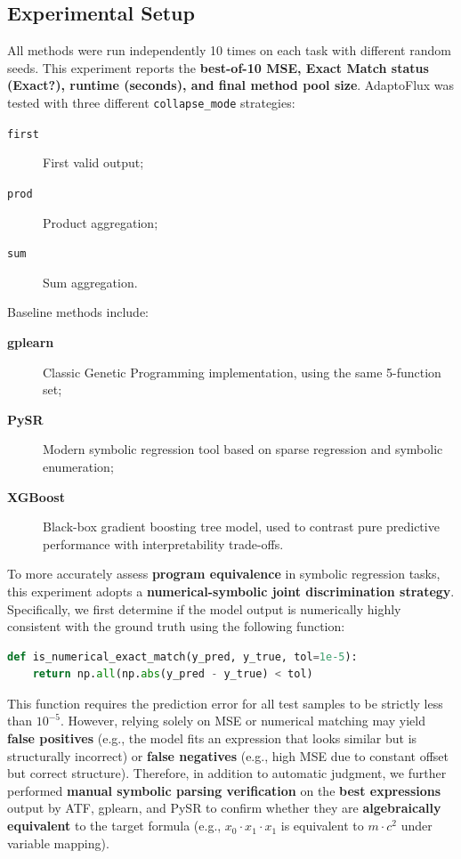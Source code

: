 \subsection{Experimental Setup}

All methods were run independently 10 times on each task with different random seeds. This experiment reports the \textbf{best-of-10 MSE, Exact Match status (Exact?), runtime (seconds), and final method pool size}. AdaptoFlux was tested with three different \texttt{collapse\_mode} strategies:
\begin{description}
    \item[\texttt{first}] First valid output;
    \item[\texttt{prod}] Product aggregation;
    \item[\texttt{sum}] Sum aggregation.
\end{description}

Baseline methods include:
\begin{description}
    \item[\textbf{gplearn}] Classic Genetic Programming implementation, using the same 5-function set;
    \item[\textbf{PySR}] Modern symbolic regression tool based on sparse regression and symbolic enumeration;
    \item[\textbf{XGBoost}] Black-box gradient boosting tree model, used to contrast pure predictive performance with interpretability trade-offs.
\end{description}

To more accurately assess \textbf{program equivalence} in symbolic regression tasks, this experiment adopts a \textbf{numerical-symbolic joint discrimination strategy}. Specifically, we first determine if the model output is numerically highly consistent with the ground truth using the following function:
\begin{lstlisting}[language=Python, basicstyle=\small\ttfamily]
def is_numerical_exact_match(y_pred, y_true, tol=1e-5):
    return np.all(np.abs(y_pred - y_true) < tol)
\end{lstlisting}
This function requires the prediction error for all test samples to be strictly less than $10^{-5}$. However, relying solely on MSE or numerical matching may yield \textbf{false positives} (e.g., the model fits an expression that looks similar but is structurally incorrect) or \textbf{false negatives} (e.g., high MSE due to constant offset but correct structure). Therefore, in addition to automatic judgment, we further performed \textbf{manual symbolic parsing verification} on the \textbf{best expressions} output by ATF, gplearn, and PySR to confirm whether they are \textbf{algebraically equivalent} to the target formula (e.g., $x_0 \cdot x_1 \cdot x_1$ is equivalent to $m \cdot c^2$ under variable mapping).

